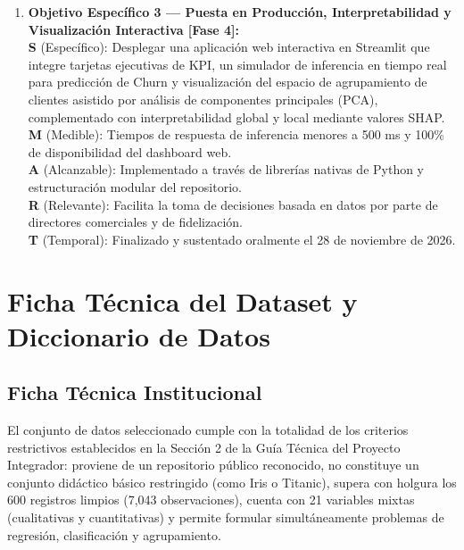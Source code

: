 \documentclass[11pt,letterpaper]{article}
\begin{document}
\begin{enumerate}
    \item \textbf{Objetivo Específico 3 — Puesta en Producción, Interpretabilidad y Visualización Interactiva [Fase 4]:}\\
    \textbf{S} (Específico): Desplegar una aplicación web interactiva en Streamlit que integre tarjetas ejecutivas de KPI, un simulador de inferencia en tiempo real para predicción de Churn y visualización del espacio de agrupamiento de clientes asistido por análisis de componentes principales (PCA), complementado con interpretabilidad global y local mediante valores SHAP.\\
    \textbf{M} (Medible): Tiempos de respuesta de inferencia menores a 500 ms y 100\% de disponibilidad del dashboard web.\\
    \textbf{A} (Alcanzable): Implementado a través de librerías nativas de Python y estructuración modular del repositorio.\\
    \textbf{R} (Relevante): Facilita la toma de decisiones basada en datos por parte de directores comerciales y de fidelización.\\
    \textbf{T} (Temporal): Finalizado y sustentado oralmente el 28 de noviembre de 2026.
\end{enumerate}

\section{Ficha Técnica del Dataset y Diccionario de Datos}

\subsection{Ficha Técnica Institucional}
El conjunto de datos seleccionado cumple con la totalidad de los criterios restrictivos establecidos en la Sección 2 de la Guía Técnica del Proyecto Integrador: proviene de un repositorio público reconocido, no constituye un conjunto didáctico básico restringido (como Iris o Titanic), supera con holgura los 600 registros limpios (7,043 observaciones), cuenta con 21 variables mixtas (cualitativas y cuantitativas) y permite formular simultáneamente problemas de regresión, clasificación y agrupamiento.
\end{document}
